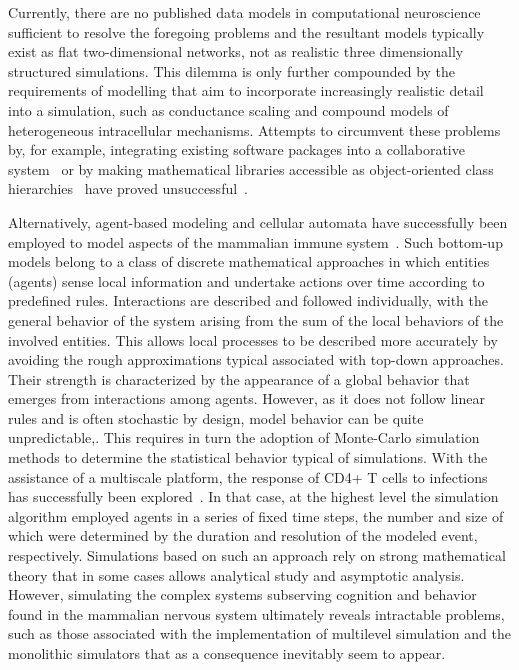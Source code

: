 \documentclass[11pt,3p,twocolumn]{JMN}
\begin{document}
Currently, there are no published data models in computational neuroscience sufficient to resolve the foregoing problems and the resultant models typically exist as flat two-dimensional networks, not as realistic three dimensionally structured simulations. This dilemma is only further compounded by the requirements of modelling that aim to incorporate increasingly realistic detail into a simulation, such as conductance scaling and compound models of heterogeneous intracellular mechanisms. Attempts to circumvent these problems by, for example, integrating existing software packages into a collaborative system~\citep{goddard01:_neosim} or by making mathematical libraries accessible as object-oriented class hierarchies~\citep{vibert01} have proved unsuccessful~\citep{cornelis03}.

Alternatively, agent-based modeling and cellular automata have successfully been employed to model aspects of the mammalian immune system~\citep{chiacchio14}. Such bottom-up models belong to a class of discrete mathematical approaches in which entities (agents) sense local information and undertake actions over time according to predefined rules. Interactions are described and followed individually, with the general behavior of the system arising from the sum of the local behaviors of the involved entities. This allows local processes to be described more accurately by avoiding the rough approximations typical associated with top-down approaches. Their strength is characterized by the appearance of a global behavior that emerges from interactions among agents. However, as it does not follow linear rules and is often stochastic by design, model behavior can be quite unpredictable,. This requires in turn the adoption of Monte-Carlo simulation methods to determine the statistical behavior typical of simulations. With the assistance of a multiscale platform, the response of CD4+ T cells to infections has successfully been explored~\citep{wertheim21}. In that case, at the highest level the simulation algorithm employed agents in a series of fixed time steps, the number and size of which were determined by the duration and resolution of the modeled event, respectively. Simulations based on such an approach rely on strong mathematical theory that in some cases allows analytical study and asymptotic analysis. However, simulating the complex systems subserving cognition and behavior found in the mammalian nervous system ultimately reveals intractable problems, such as those associated with the implementation of multilevel simulation and the monolithic simulators that as a consequence inevitably seem to appear.
\end{document}
